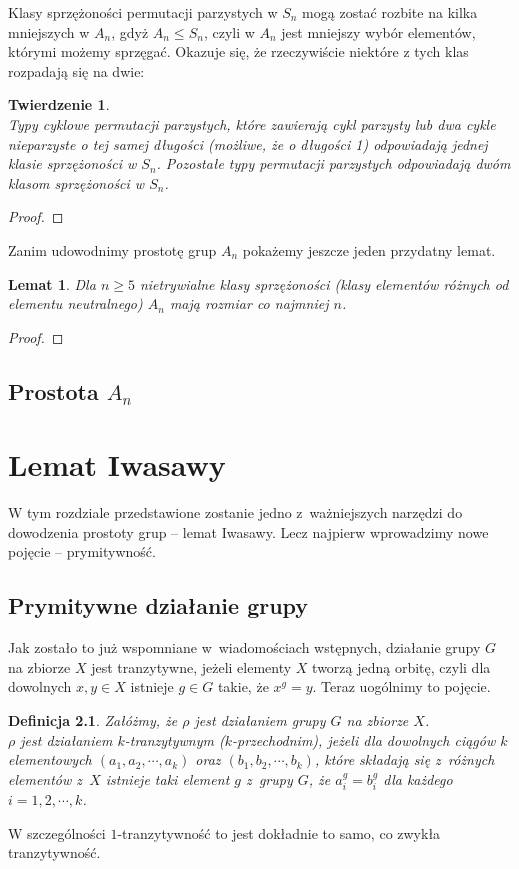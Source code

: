 \documentclass[licencjacka]{pracamgr}
\newtheorem{deff}{Definicja}[section]
\newtheorem{thh}{Twierdzenie}[section]
\newtheorem{lemma}{Lemat}[section]
\begin{document}
Klasy sprzężoności permutacji parzystych w $S_n$ mogą zostać rozbite na kilka mniejszych w $A_n$, 
gdyż $A_n \le S_n$, czyli w $A_n$ jest mniejszy wybór elementów, którymi możemy sprzęgać.
Okazuje się, że rzeczywiście niektóre z tych klas rozpadają się na dwie:

\begin{thh} $ $ \\
	Typy cyklowe permutacji parzystych, które zawierają cykl parzysty lub dwa cykle nieparzyste o tej samej długości (możliwe, że o długości 1)
	odpowiadają jednej klasie sprzężoności w $S_n$.
	Pozostałe typy permutacji parzystych odpowiadają dwóm klasom sprzężoności w $S_n$.
\end{thh}
\begin{proof}
\end{proof}

Zanim udowodnimy prostotę grup $A_n$ pokażemy jeszcze jeden przydatny lemat.

\begin{lemma}
	Dla $n \ge 5$ nietrywialne klasy sprzężoności (klasy elementów różnych od elementu neutralnego) $A_n$ mają rozmiar co najmniej $n$.
\end{lemma}
\begin{proof}
\end{proof}


\section{Prostota $A_n$}





\chapter{Lemat Iwasawy}
W tym rozdziale przedstawione zostanie jedno z~ważniejszych narzędzi do dowodzenia prostoty grup -- lemat Iwasawy.
Lecz najpierw wprowadzimy nowe pojęcie --  prymitywność.

\section{Prymitywne działanie grupy}
Jak zostało to już wspomniane w~wiadomościach wstępnych, działanie grupy $G$ na zbiorze $X$ jest tranzytywne, 
jeżeli elementy $X$ tworzą jedną orbitę, czyli dla dowolnych $x, y \in X$ istnieje $g \in G$ takie, że $x^g = y$.
Teraz uogólnimy to pojęcie.

\begin{deff}
	Załóżmy, że $\rho$ jest działaniem grupy $G$ na zbiorze $X$. \\
	\emph{$\rho$ jest działaniem $k$-tranzytywnym ($k$-przechodnim)}, 
	jeżeli dla dowolnych ciągów $k$ elementowych $(a_1, a_2, \cdots, a_k)$ oraz $(b_1, b_2, \cdots, b_k)$, 
	które składają się z~różnych elementów z~$X$ istnieje taki element $g$ z~grupy $G$, że
	$a_i^g = b_i^g$ dla każdego $i = 1, 2, \cdots, k$.
\end{deff}
W szczególności $1$-tranzytywność to jest dokładnie to samo, co zwykła tranzytywność.
\end{document}
